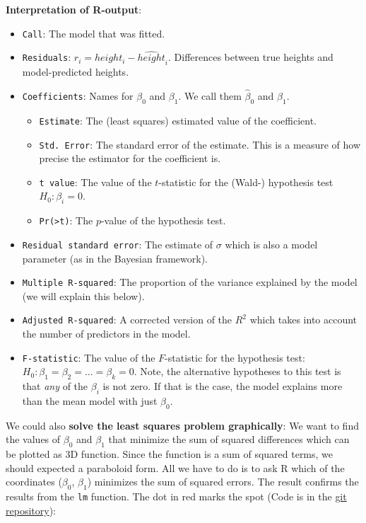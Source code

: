 \documentclass[
]{book}
\providecommand{\tightlist}{%
  \setlength{\itemsep}{0pt}\setlength{\parskip}{0pt}}
\begin{document}
\textbf{Interpretation of R-output}:

\begin{itemize}
\tightlist
\item
  \texttt{Call}: The model that was fitted.
\item
  \texttt{Residuals}: \(r_i = height_i - \widehat{height}_i\).
  Differences between true heights and model-predicted heights.
\item
  \texttt{Coefficients}: Names for \(\beta_0\) and \(\beta_1\). We call them \(\hat{\beta}_0\) and \(\hat{\beta}_1\).

  \begin{itemize}
  \tightlist
  \item
    \texttt{Estimate}: The (least squares) estimated value of the coefficient.
  \item
    \texttt{Std.\ Error}: The standard error of the estimate.
    This is a measure of how precise the estimator for the coefficient is.
  \item
    \texttt{t\ value}: The value of the \(t\)-statistic for the (Wald-) hypothesis test
    \(H_0: \beta_i = 0\).
  \item
    \texttt{Pr(\textgreater{}\textbar{}t\textbar{})}: The \(p\)-value of the hypothesis test.
  \end{itemize}
\item
  \texttt{Residual\ standard\ error}: The estimate of \(\sigma\)
  which is also a model parameter (as in the Bayesian framework).
\item
  \texttt{Multiple\ R-squared}: The proportion of the variance explained by the
  model (we will explain this below).
\item
  \texttt{Adjusted\ R-squared}: A corrected version of the \(R^2\) which takes into account
  the number of predictors in the model.
\item
  \texttt{F-statistic}: The value of the \(F\)-statistic for the hypothesis test:
  \(H_0: \beta_1 = \beta_2 = \dots = \beta_k = 0\). Note, the alternative
  hypotheses to this test is that \emph{any} of the \(\beta_i\) is not zero. If that is
  the case, the model explains more than the mean model with just \(\beta_0\).
\end{itemize}

We could also \textbf{solve the least squares problem graphically}: We want to find the
values of \(\beta_0\) and \(\beta_1\) that minimize the sum of squared differences
which can be plotted as 3D function. Since the function is a sum of squared terms,
we should expected a paraboloid form.
All we have to do is to ask R which of
the coordinates (\(\beta_0\), \(\beta_1\)) minimizes the sum of squared errors.
The result confirms
the results from the \texttt{lm} function. The dot in red marks the spot
(Code is in the \href{https://github.com/jdegenfellner/Script_QM2_ZHAW}{git repository}):
\end{document}

